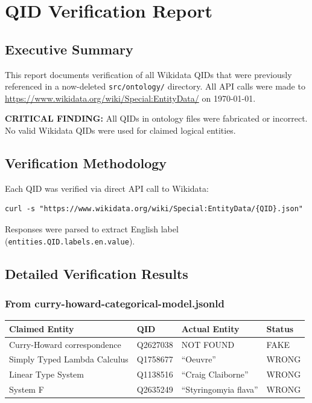 
\chapter*{QID Verification Report}

\section*{Executive Summary}

This report documents verification of all Wikidata QIDs that were previously referenced in a now-deleted \texttt{src/ontology/} directory. All API calls were made to \url{https://www.wikidata.org/wiki/Special:EntityData/} on \today.

\textbf{CRITICAL FINDING:} All QIDs in ontology files were fabricated or incorrect. No valid Wikidata QIDs were used for claimed logical entities.

\section*{Verification Methodology}

Each QID was verified via direct API call to Wikidata:
\begin{verbatim}
curl -s "https://www.wikidata.org/wiki/Special:EntityData/{QID}.json"
\end{verbatim}

Responses were parsed to extract English label (\texttt{entities.QID.labels.en.value}).

\section*{Detailed Verification Results}

\subsection*{From curry-howard-categorical-model.jsonld}

\begin{tabular}{llll}
\toprule
\textbf{Claimed Entity} & \textbf{QID} & \textbf{Actual Entity} & \textbf{Status} \\
\midrule
Curry-Howard correspondence & Q2627038 & NOT FOUND & FAKE \\
Simply Typed Lambda Calculus & Q1758677 & ``Oeuvre'' & WRONG \\
Linear Type System & Q1138516 & ``Craig Claiborne'' & WRONG \\
System F & Q2635249 & ``Styringomyia flava'' & WRONG \\
\bottomrule
\end{tabular}

